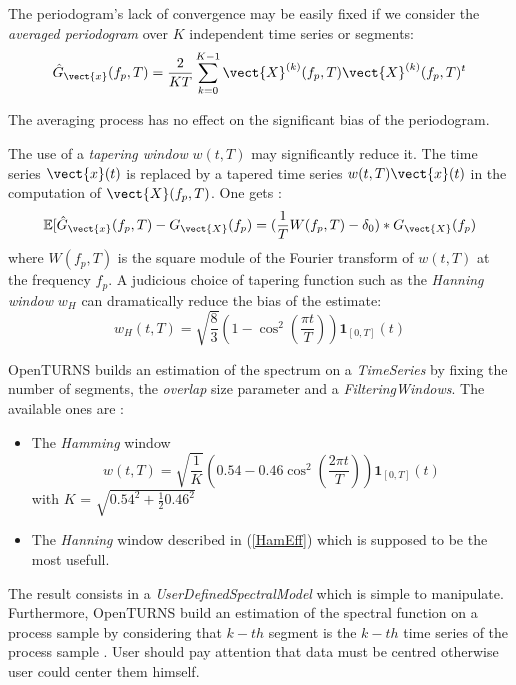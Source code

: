 The periodogram's lack of convergence may be easily fixed if we  consider the \emph{averaged periodogram} over $K$ independent time series or segments:
\begin{equation}
  \hat{G}_{\vect{x}}(f_p,T)=\frac{2}{KT}\sum_{k=0}^{K-1}\vect{X}^{(k)}(f_p,T)\vect{X}^{(k)}(f_p,T)^t
\end{equation}

The averaging process has no effect on the significant bias of the periodogram.

The use of a \emph{tapering window} $w(t, T)$ may significantly reduce it. The time series $\vect{x}(t)$ is replaced by a tapered time series $w(t, T)\vect{x}(t)$ in the
computation of $\vect{X}(f_p,T)$. One gets :
\begin{equation}
  \mathbb{E}[\hat{G}_{\vect{x}}(f_p, T)-G_{\vect{X}}(f_p)=(\frac{1}{T}W(f_p, T)-\delta_0)*G_{\vect{X}}(f_p)
\end{equation}
where $W(f_p, T)$ is the square module of the Fourier transform of $w(t, T)$ at the frequency $f_p$.
A judicious choice of tapering function such as the \emph{Hanning window} $w_H$ can dramatically reduce the bias of the estimate:
\begin{equation}\label{HamEff}
  w_H(t, T) = \sqrt{\frac{8}{3}}\left(1-\cos^2\left(\frac{\pi t}{T}\right)\right)\mathbf{1}_{[0,T]}(t)
\end{equation}

OpenTURNS builds an estimation of the spectrum on a \textit{TimeSeries} by fixing the number of segments, the \textit{overlap} size parameter and a \textit{FilteringWindows}. The available ones are :
\begin{itemize}
\item The \textit{Hamming} window
  \begin{equation}
    w(t, T) = \sqrt{\frac{1}{K}}\left(0.54-0.46\cos^2\left(\frac{2 \pi t}{T}\right)\right)\mathbf{1}_{[0,T]}(t)
  \end{equation}
  with $K$ = $\sqrt{0.54^2 + \frac{1}{2} 0.46^2}$
\item The \textit{Hanning} window described in (\ref{HamEff}) which is supposed to be the most usefull.
\end{itemize}
The result consists in a \textit{UserDefinedSpectralModel} which is simple to manipulate. \\

Furthermore, OpenTURNS build an estimation of the spectral function on a process sample by considering that $k-th$ segment is the $k-th$ time series  of the process sample .
User should pay attention that data must be centred otherwise user could center them himself. \\


